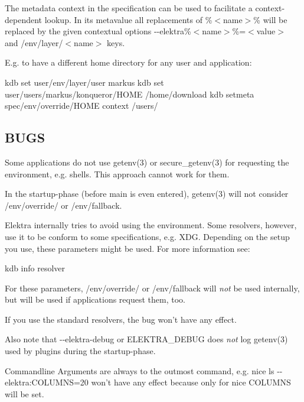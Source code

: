 The metadata {\ttfamily context} in the specification can be used to facilitate a context-\/dependent lookup. In its metavalue all replacements of {\ttfamily \%$<$name$>$\%} will be replaced by the given contextual options {\ttfamily -\/-\/elektra\%$<$name$>$\%=$<$value$>$} and {\ttfamily /env/layer/$<$name$>$} keys.

E.\+g. to have a different home directory for any user and application\+: \begin{DoxyVerb}kdb set user/env/layer/user markus
kdb set user/users/markus/konqueror/HOME /home/download
kdb setmeta spec/env/override/HOME context  /users/%
\end{DoxyVerb}


\subsection*{B\+U\+G\+S}

Some applications do not use {\ttfamily getenv(3)} or {\ttfamily secure\+\_\+getenv(3)} for requesting the environment, e.\+g. shells. This approach cannot work for them.

In the startup-\/phase (before main is even entered), {\ttfamily getenv(3)} will not consider {\ttfamily /env/override/} or {\ttfamily /env/fallback}.

Elektra internally tries to avoid using the environment. Some resolvers, however, use it to be conform to some specifications, e.\+g. X\+D\+G. Depending on the setup you use, these parameters might be used. For more information see\+: \begin{DoxyVerb}kdb info resolver
\end{DoxyVerb}


For these parameters, {\ttfamily /env/override/} or {\ttfamily /env/fallback} will {\itshape not} be used internally, but will be used if applications request them, too.

If you use the standard resolvers, the bug won't have any effect.

Also note that {\ttfamily -\/-\/elektra-\/debug} or {\ttfamily E\+L\+E\+K\+T\+R\+A\+\_\+\+D\+E\+B\+U\+G} does {\itshape not} log {\ttfamily getenv(3)} used by plugins during the startup-\/phase.

Commandline Arguments are always to the outmost command, e.\+g. {\ttfamily nice ls -\/-\/elektra\+:C\+O\+L\+U\+M\+N\+S=20} won't have any effect because only for {\ttfamily nice} {\ttfamily C\+O\+L\+U\+M\+N\+S} will be set.

